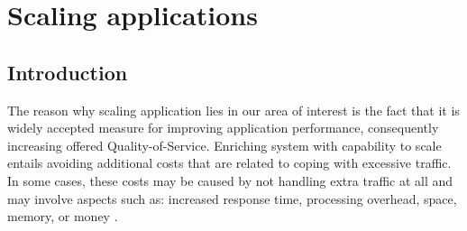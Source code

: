 \newpage
\section{Scaling applications}

\subsection{Introduction}

The reason why scaling application lies in our area of interest is the fact that it is widely accepted measure for improving application performance, consequently increasing offered Quality-of-Service. Enriching system with capability to scale entails avoiding additional costs that are related to coping with excessive traffic. In some cases, these costs may be caused by not handling extra traffic at all and may involve aspects such as: increased response time, processing overhead, space, memory, or money \cite{Bo00}. 

